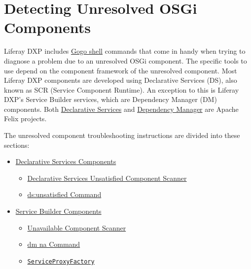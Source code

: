 \chapter{Detecting Unresolved OSGi
Components}\label{detecting-unresolved-osgi-components}

Liferay DXP includes
\href{/docs/7-2/customization/-/knowledge_base/c/using-the-felix-gogo-shell}{Gogo
shell} commands that come in handy when trying to diagnose a problem due
to an unresolved OSGi component. The specific tools to use depend on the
component framework of the unresolved component. Most Liferay DXP
components are developed using Declarative Services (DS), also known as
SCR (Service Component Runtime). An exception to this is Liferay DXP's
Service Builder services, which are Dependency Manager (DM) components.
Both
\href{http://felix.apache.org/documentation/subprojects/apache-felix-service-component-runtime.html}{Declarative
Services} and
\href{http://felix.apache.org/documentation/subprojects/apache-felix-dependency-manager.html}{Dependency
Manager} are Apache Felix projects.

The unresolved component troubleshooting instructions are divided into
these sections:

\begin{itemize}
\tightlist
\item
  \hyperref[declarative-services-components]{Declarative Services
  Components}

  \begin{itemize}
  \tightlist
  \item
    \hyperref[declarative-services-unsatisfied-component-scanner]{Declarative
    Services Unsatisfied Component Scanner}
  \item
    \hyperref[dsunsatisfied-command]{ds:unsatisfied Command}
  \end{itemize}
\item
  \hyperref[service-builder-components]{Service Builder Components}

  \begin{itemize}
  \tightlist
  \item
    \hyperref[unavailable-component-scanner]{Unavailable Component
    Scanner}
  \item
    \hyperref[dm-na-command]{dm na Command}
  \item
    \hyperref[serviceproxyfactory]{\texttt{ServiceProxyFactory}}
  \end{itemize}
\end{itemize}

